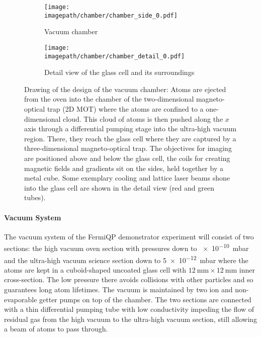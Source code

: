 \begin{figure}
    \centering
    \begin{subfigure}[t]{0.64\textwidth}
        \centering
        \texttt{[image: \\imagepath/chamber/chamber\_side\_0.pdf]}
        \caption{Vacuum chamber}
        \label{fig:chamber_coarse}
    \end{subfigure}
    \begin{subfigure}[t]{0.34\textwidth}
        \centering
        \texttt{[image: \\imagepath/chamber/chamber\_detail\_0.pdf]}
        \caption{Detail view of the glass cell and its surroundings}
        \label{fig:chamber_detail}
    \end{subfigure}
    \caption{Drawing of the design of the vacuum chamber: Atoms are ejected from the oven into the chamber of the two-dimensional magneto-optical trap (2D MOT) where the atoms are confined to a one-dimensional cloud. This cloud of atoms is then pushed along the $x$ axis through a differential pumping stage into the ultra-high vacuum region. There, they reach the glass cell where they are captured by a three-dimensional magneto-optical trap. The objectives for imaging are positioned above and below the glass cell, the coils for creating magnetic fields and gradients sit on the sides, held together by a metal cube. Some exemplary cooling and lattice laser beams shone into the glass cell are shown in the detail view (red and green tubes).}
    \label{fig:chamber}
\end{figure}

\paragraph{Vacuum System}
The vacuum system of the FermiQP demonstrator experiment will consist of two sections: the high vacuum oven section with pressures down to \SI[]{e-10}{\milli\bar} and the ultra-high vacuum science section down to \SI[]{5e-12}{\milli\bar} where the atoms are kept in a cuboid-shaped uncoated glass cell  with $\SI[]{12}{\milli\meter} \times \SI[]{12}{\milli\meter}$ inner cross-section. The low pressure there avoids collisions with other particles and so guarantees long atom lifetimes. The vacuum is maintained by two ion and non-evaporable getter pumps on top of the chamber. The two sections are connected with a thin differential pumping tube with low conductivity impeding the flow of residual gas from the high vacuum to the ultra-high vacuum section, still allowing a beam of atoms to pass through.

